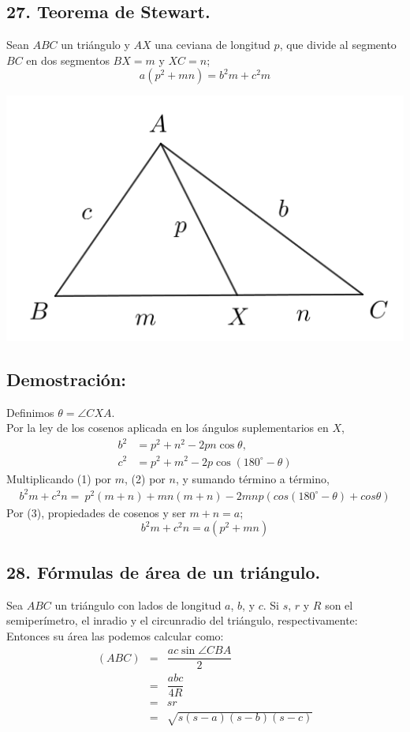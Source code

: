 \documentclass[12pt,a4paper]{article}
\begin{document}
\subsection*{27. Teorema de Stewart.}
Sean $ABC$ un triángulo y $AX$ una ceviana de longitud $p$, que divide al segmento $BC$ en dos segmentos $BX=m$ y $XC=n$; $$a(p^2 +mn) = b^2m + c^2m$$
\begin{center}
\includegraphics[scale=0.6]{Imagenes/stewart.png} 
\end{center}
\subsection*{Demostración:}
Definimos $\theta=\angle CXA$.
\\Por la ley de los cosenos aplicada en los ángulos suplementarios en $X$,
\setcounter{equation}{0}
\begin{align}
b^2&= p^2 + n^2-2pn \cos \theta,\\
c^2&= p^2 + m^2-2p \cos (180^{\circ}-\theta)
\end{align}
Multiplicando (1) por $m$, (2) por $n$, y sumando término a término, 
\begin{eqnarray}
b^2m + c^2n=\ p^2(m+n)+mn(m+n)-2mnp(cos(180^{\circ}-\theta)+cos \theta )
\end{eqnarray}
Por (3), propiedades de cosenos y ser $m+n=a$;
$$b^2m + c^2n=a(p^2+mn)$$
\subsection*{28. Fórmulas de área de un triángulo.}
Sea $ABC$ un triángulo con lados de longitud $a$, $b$, y $c$. Si $s$, $r$ y $R$ son el semiperímetro, el inradio y el circunradio del triángulo, respectivamente: Entonces su área las podemos calcular como:
\begin{eqnarray*}
(ABC)&=& \dfrac{ac \sin \angle CBA}{2}
\\&=& \dfrac{abc}{4R}
\\&=& sr
\\&=& \sqrt{s(s-a)(s-b)(s-c)}
\end{eqnarray*}
\end{document}
